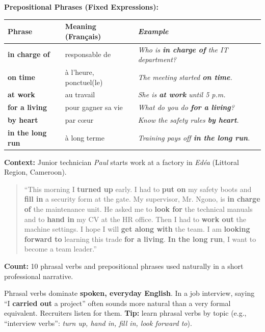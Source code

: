 \documentclass[11pt]{article}
\begin{document}
\textbf{Prepositional Phrases (Fixed Expressions):}
\begin{center}
\begin{tabularx}{\linewidth}{|>{\bfseries}l|X|>{\itshape}X|}\hline
\rowcolor{popgreenL}\textnormal{\textbf{Phrase}} & \textnormal{\textbf{Meaning (Français)}} & \textnormal{\textbf{Example}} \\ \hline
in charge of & responsable de & Who is \textbf{in charge of} the IT department? \\ \hline
on time & à l'heure, ponctuel(le) & The meeting started \textbf{on time}. \\ \hline
at work & au travail & She is \textbf{at work} until 5 p.m. \\ \hline
for a living & pour gagner sa vie & What do you do \textbf{for a living}? \\ \hline
by heart & par cœur & Know the safety rules \textbf{by heart}. \\ \hline
in the long run & à long terme & Training pays off \textbf{in the long run}. \\ \hline
\end{tabularx}
\end{center}

\begin{aretenir}
\textbf{Context:} Junior technician \emph{Paul} starts work at a factory in \emph{Edéa} (Littoral Region, Cameroon).
\begin{quote}
``This morning I \textbf{turned up} early. I had to \textbf{put on} my safety boots and \textbf{fill in} a security form at the gate. My supervisor, Mr. Ngono, is \textbf{in charge of} the maintenance unit. He asked me to \textbf{look for} the technical manuals and to \textbf{hand in} my CV at the HR office. Then I had to \textbf{work out} the machine settings. I hope I will \textbf{get along with} the team. I am \textbf{looking forward to} learning this trade \textbf{for a living}. \textbf{In the long run}, I want to become a team leader.''
\end{quote}
\textbf{Count:} 10 phrasal verbs and prepositional phrases used naturally in a short professional narrative.
\end{aretenir}

\begin{savaistu}
Phrasal verbs dominate \textbf{spoken, everyday English}. In a job interview, saying ``I \textbf{carried out} a project'' often sounds more natural than a very formal equivalent. Recruiters listen for them. \textbf{Tip:} learn phrasal verbs by topic (e.g., ``interview verbs'': \emph{turn up, hand in, fill in, look forward to}).
\end{savaistu}
\end{document}
